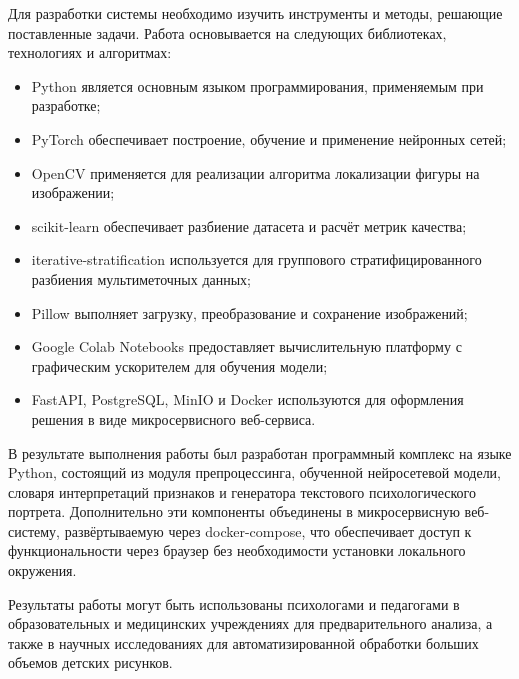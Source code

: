 Для разработки системы необходимо изучить инструменты и методы, решающие поставленные задачи. Работа основывается на следующих библиотеках, технологиях и алгоритмах:

\begin{itemize}
    \item Python является основным языком программирования, применяемым при разработке;
    \item PyTorch обеспечивает построение, обучение и применение нейронных сетей;
    \item OpenCV применяется для реализации алгоритма локализации фигуры на изображении;
    \item scikit-learn обеспечивает разбиение датасета и расчёт метрик качества;
    \item iterative-stratification используется для группового стратифицированного разбиения мультиметочных данных;
    \item Pillow выполняет загрузку, преобразование и сохранение изображений;
    \item Google Colab Notebooks предоставляет вычислительную платформу с графическим ускорителем для обучения модели;
    \item FastAPI, PostgreSQL, MinIO и Docker используются для оформления решения в виде микросервисного веб-сервиса.
\end{itemize}

В результате выполнения работы был разработан программный комплекс на языке Python, состоящий из модуля препроцессинга, обученной нейросетевой модели, словаря интерпретаций признаков и генератора текстового психологического портрета. Дополнительно эти компоненты объединены в микросервисную веб-систему, развёртываемую через docker-compose, что обеспечивает доступ к функциональности через браузер без необходимости установки локального окружения.

Результаты работы могут быть использованы психологами и педагогами в образовательных и медицинских учреждениях для предварительного анализа, а также в научных исследованиях для автоматизированной обработки больших объемов детских рисунков.
